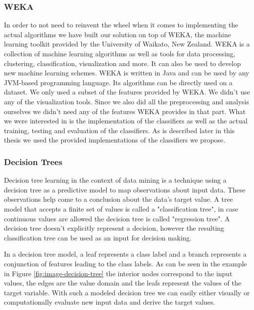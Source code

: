 \subsubsection{WEKA}
In order to not need to reinvent the wheel when it comes to implementing the actual algorithms we have built our solution on top of WEKA, the machine learning toolkit provided by the University of Waikato, New Zealand. WEKA is a collection of machine learning algorithms as well as tools for data processing, clustering, classification, visualization and more. It can also be used to develop new machine learning schemes. WEKA is written in Java and can be used by any JVM-based programming language. Its algorithms can be directly used on a dataset. We only used a subset of the features provided by WEKA. We didn't use any of the visualization tools. Since we also did all the preprocessing and analysis ourselves we didn't need any of the features WEKA provides in that part. What we were interested in is the implementation of the classifiers as well as the actual training, testing and evaluation of the classifiers. As is described later in this thesis we used the provided implementations of the classifiers we propose. 

\subsubsection{Decision Trees}
Decision tree learning in the context of data mining is a technique using a decision tree as a predictive model to map observations about input data. These observations help come to a conclusion about the data's target value. A tree model that accepts a finite set of values is called a "classification tree", in case continuous values are allowed the decision tree is called "regression tree". A decision tree doesn't explicitly represent a decision, however the resulting classification tree can be used as an input for decision making. 

In a decision tree model, a leaf represents a class label and a branch represents a conjunction of features leading to the class labels. As can be seen in the example in Figure \ref{fig:image-decision-tree} the interior nodes correspond to the input values, the edges are the value domain and the leafs represent the values of the target variable. With such a modeled decision tree we can easily either visually or computationally evaluate new input data and derive the target values.

